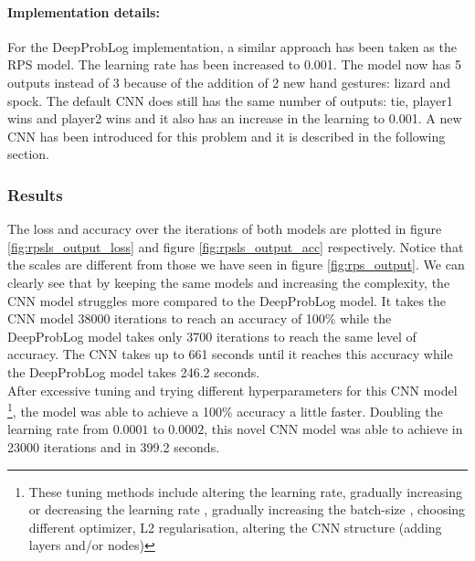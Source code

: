 \paragraph{Implementation details:} For the DeepProbLog implementation, a similar approach has been taken as the RPS model. The learning rate has been increased to 0.001. The model now has 5 outputs instead of 3 because of the addition of 2 new hand gestures: lizard and spock. The default CNN does still has the same number of outputs: tie, player1 wins and player2 wins and it also has an increase in the learning to 0.001. A new CNN has been introduced for this problem and it is described in the following section.

\subsubsection{Results}
The loss and accuracy over the iterations of both models are plotted in figure \ref{fig:rpsls_output_loss} and figure \ref{fig:rpsls_output_acc} respectively. Notice that the scales are different from those we have seen in figure \ref{fig:rps_output}. We can clearly see that by keeping the same models and increasing the complexity, the CNN model struggles more compared to the DeepProbLog model. It takes the CNN model 38000 iterations to reach an accuracy of 100\% while the DeepProbLog model takes only 3700 iterations to reach the same level of accuracy. The CNN takes up to 661 seconds until it reaches this accuracy while the DeepProbLog model takes 246.2 seconds.
\\
After excessive tuning and trying different hyperparameters for this CNN model \footnote{These tuning methods include altering the learning rate, gradually increasing or decreasing the learning rate \cite{lr-decay}, gradually increasing the batch-size \cite{increase-batch}, choosing different optimizer, L2 regularisation, altering the CNN structure (adding layers and/or nodes)}, the model was able to achieve a 100\% accuracy a little faster.  Doubling the learning rate from $0.0001$ to $0.0002$, this novel CNN model was able to achieve in 23000 iterations and in 399.2 seconds. 

